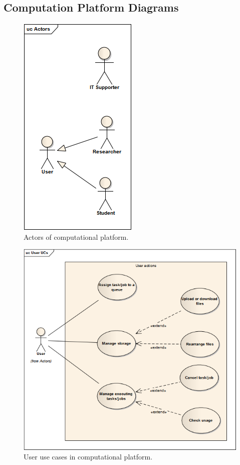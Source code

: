 \documentclass{report}
\begin{document}
\subsection{Computation Platform Diagrams}
	\begin{figure}[!hbtp]
		\centering
		\includegraphics{../ea_files/generatedImages/Computational_platform/Actors.png}
		\caption{Actors of computational platform.}
		\label{app:cp:actors}
	\end{figure}
	\begin{figure}[!hbtp]
		\centering
		\includegraphics[width=\textwidth]{../ea_files/generatedImages/Computational_platform/UserUCs.png}
		\caption{User use cases in computational platform.}
		\label{app:cp:ucs}
	\end{figure}
\end{document}

